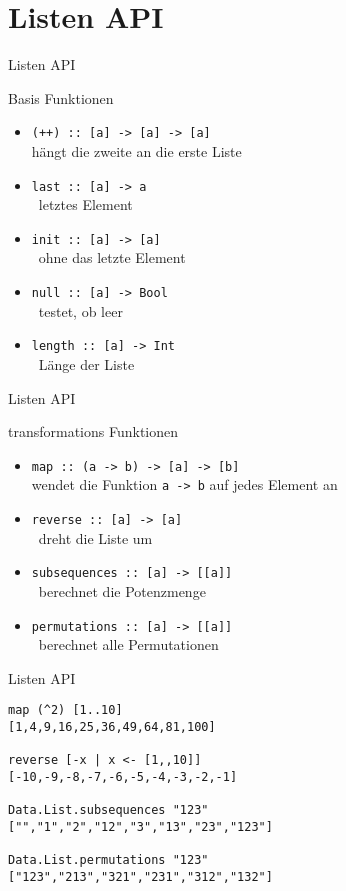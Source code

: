 \documentclass[fleqn,11pt,aspectratio=43]{beamer}
\begin{document}
\section{Listen API}

\begin{frame}[fragile]{Listen API}
\begin{block}{Basis Funktionen}
\begin{itemize}
\item \lstinline|(++) :: [a] -> [a] -> [a]| \\ hängt die zweite an die erste Liste 
\item \lstinline|last :: [a] -> a| \\ letztes Element
\item \lstinline|init :: [a] -> [a]| \\ ohne das letzte Element
\item \lstinline|null :: [a] -> Bool| \\ testet, ob leer
\item \lstinline|length :: [a] -> Int| \\ Länge der Liste
\end{itemize}
\end{block}
\end{frame}

\begin{frame}[fragile]{Listen API}
\begin{block}{transformations Funktionen}
\begin{itemize}
\item \lstinline|map :: (a -> b) -> [a] -> [b]| \\ wendet die Funktion \lstinline|a -> b| auf jedes Element an
\item \lstinline|reverse :: [a] -> [a]| \\ dreht die Liste um
\item \lstinline|subsequences :: [a] -> [[a]]| \\ berechnet die Potenzmenge
\item \lstinline|permutations :: [a] -> [[a]]| \\ berechnet alle Permutationen
\end{itemize}
\end{block}
\end{frame}

\begin{frame}[fragile]{Listen API}
\begin{lstlisting}
map (^2) [1..10]
[1,4,9,16,25,36,49,64,81,100]

reverse [-x | x <- [1,,10]]
[-10,-9,-8,-7,-6,-5,-4,-3,-2,-1]

Data.List.subsequences "123"
["","1","2","12","3","13","23","123"]

Data.List.permutations "123"
["123","213","321","231","312","132"]
\end{lstlisting}
\end{frame}
\end{document}
